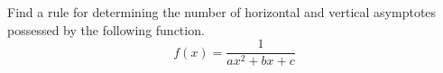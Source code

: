 Find a rule for determining the number of horizontal and vertical asymptotes
possessed by the following function.
\begin{equation*}
  f(x) = \frac{1}{ax^2+bx+c}
\end{equation*}
